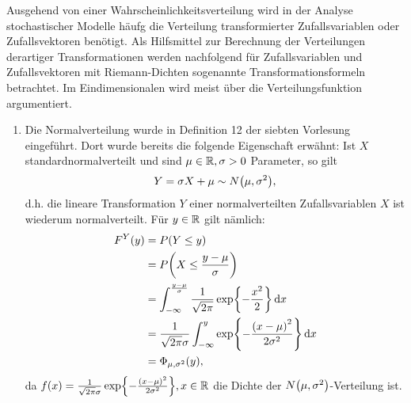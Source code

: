 \documentclass{lecture}
\begin{document}
    Ausgehend von einer Wahrscheinlichkeitsverteilung wird in der Analyse stochastischer Modelle häufg die Verteilung transformierter Zufallsvariablen oder Zufallsvektoren benötigt.
    Als Hilfsmittel zur Berechnung der Verteilungen derartiger Transformationen werden nachfolgend für Zufallsvariablen und Zufallsvektoren mit Riemann-Dichten sogenannte Transformationsformeln betrachtet.
    Im Eindimensionalen wird meist über die Verteilungsfunktion argumentiert.

    \begin{example}
        \begin{enumerate}
            \item Die Normalverteilung wurde in Definition 12 der siebten Vorlesung eingeführt.
            Dort wurde bereits die folgende Eigenschaft erwähnt: Ist \(X\) standardnormalverteilt und sind \(\mu \in \mathbb{R}, \sigma > 0\) Parameter, so gilt
            \[
                Y = \sigma X + \mu \sim N\parentheses*{\mu, \sigma^2},
            \]
            d.h. die lineare Transformation \(Y\) einer normalverteilten Zufallsvariablen \(X\) ist wiederum normalverteilt.
            Für \(y \in \mathbb{R}\) gilt nämlich:
            \begin{align*}
                F^Y\parentheses*{y} &= P\parentheses*{Y \le y}\\
                &= P\parentheses*{X \le \frac{y - \mu}{\sigma}}\\
                &= \int_{-\infty}^{\frac{y - \mu}{\sigma}}\frac{1}{\sqrt{2\pi}}\exp\braces*{-\frac{x^2}{2}}\d x\\
                &= \frac{1}{\sqrt{2\pi}\sigma}\int_{-\infty}^y \exp\braces*{-\frac{\parentheses*{x - \mu}^2}{2\sigma^2}}\d x\\
                &= \Phi_{\mu, \sigma^2}\parentheses*{y},
            \end{align*}
            da \(f\parentheses*{x} = \frac{1}{\sqrt{2\pi}\sigma}\exp\braces*{-\frac{\parentheses*{x - \mu}^2}{2\sigma^2}}, x \in \R\) die Dichte der \(N\parentheses*{\mu, \sigma^2}\)-Verteilung ist.


\end{enumerate}
\end{example}
\end{document}
